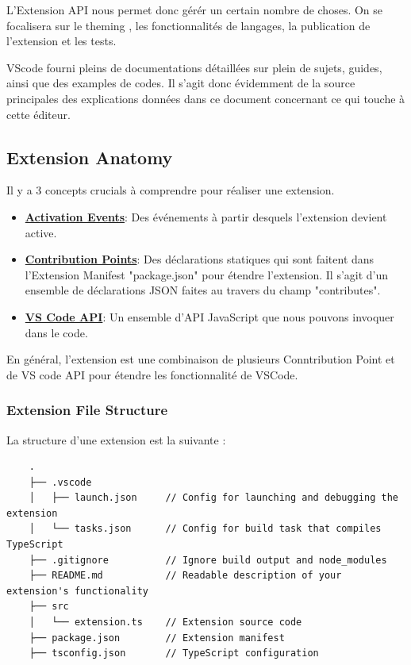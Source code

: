 \documentclass[
    iict, %
    il, %
]{heig-tb}
\begin{document}
L'Extension API nous permet donc gérér un certain nombre de choses.
On se focalisera sur le theming , les fonctionnalités de langages, la publication de l'extension et les tests.

VScode fourni pleins de documentations détaillées sur plein de sujets, guides, ainsi que des examples de codes.
Il s'agit donc évidemment de la source principales des explications données dans ce document concernant ce qui touche à cette éditeur.

\subsection{Extension Anatomy}
Il y a 3 concepts crucials à comprendre pour réaliser une extension.

\begin{itemize}
    \item \textbf{\href{https://code.visualstudio.com/api/references/activation-events}{Activation Events}}: Des événements à partir desquels l'extension devient active.
    \item \textbf{\href{https://code.visualstudio.com/api/references/contribution-points}{Contribution Points}}: Des déclarations statiques qui sont faitent dans l'Extension Manifest "package.json" pour étendre l'extension. Il s'agit d'un ensemble de déclarations JSON faites au travers du champ "contributes".
    \item \textbf{\href{https://code.visualstudio.com/api/references/vscode-api}{VS Code API}}: Un ensemble d'API JavaScript que nous pouvons invoquer dans le code.
\end{itemize}

En général, l'extension est une combinaison de plusieurs Conntribution Point et de VS code API pour étendre les fonctionnalité de VSCode.

\subsubsection{Extension File Structure}\label{Extension File Structure}
La structure d'une extension est la suivante :
\begin{lstlisting}
    .
    ├── .vscode
    │   ├── launch.json     // Config for launching and debugging the extension
    │   └── tasks.json      // Config for build task that compiles TypeScript
    ├── .gitignore          // Ignore build output and node_modules
    ├── README.md           // Readable description of your extension's functionality
    ├── src
    │   └── extension.ts    // Extension source code
    ├── package.json        // Extension manifest
    ├── tsconfig.json       // TypeScript configuration
\end{lstlisting}
\end{document}

